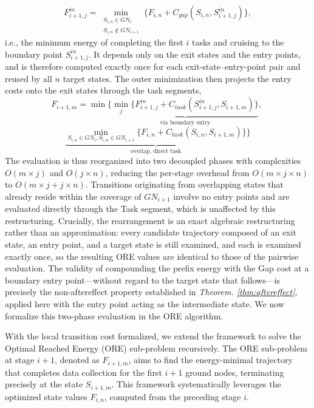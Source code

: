 \begin{equation}
F^{in}_{i+1,j} = \min_{\substack{S_{i,n} \in GN_i \\ S_{i,n} \notin GN_{i+1}}} \big\{ F_{i,n} + C_{gap}(S_{i,n}, S^{in}_{i+1,j}) \big\},
\label{equ:fin}
\end{equation}
i.e., the minimum energy of completing the first $i$ tasks and cruising to the boundary point $S^{in}_{i+1,j}$.
It depends only on the exit states and the entry points, and is therefore computed exactly once for each exit-state--entry-point pair and reused by all $n$ target states.
The outer minimization then projects the entry costs onto the exit states through the task segments,
\[
F_{i+1,m} = \min\Big\{ \underbrace{\min_{j} \big\{ F^{in}_{i+1,j}+ C_{task}(S^{in}_{i+1,j}, S_{i+1,m}) \big\}}_{\text{via boundary entry}},\;
\]
\[
 \underbrace{\min_{S_{i,n} \in GN_i , S_{i,n} \in GN_{i+1}} \big\{ F_{i,n} + C_{task}(S_{i,n}, S_{i+1,m}) \big\}}_{\text{overlap, direct task}} \Big\}
\]
The evaluation is thus reorganized into two decoupled phases with complexities $O(m \times j)$ and $O(j \times n)$, reducing the per-stage overhead from $O(m \times j \times n)$ to $O(m \times j + j\times n)$.
Transitions originating from overlapping states that already reside within the coverage of $GN_{i+1}$ involve no entry points and are evaluated directly through the Task segment, which is unaffected by this restructuring.
Crucially, the rearrangement is an exact algebraic restructuring rather than an approximation: every candidate trajectory composed of an exit state, an entry point, and a target state is still examined, and each is examined exactly once, so the resulting ORE values are identical to those of the pairwise evaluation.
The validity of compounding the prefix energy with the Gap cost at a boundary entry point—without regard to the target state that follows—is precisely the non-aftereffect property established in \textit{Theorem. \ref{thm:aftereffect}}, applied here with the entry point acting as the intermediate state.
We now formalize this two-phase evaluation in the ORE algorithm.

With the local transition cost formalized, we extend the framework to solve the Optimal Reached Energy (ORE) sub-problem recursively.
The ORE sub-problem at stage $i+1$, denoted as $F_{i+1,m}$, aims to find the energy-minimal trajectory that completes data collection for the first $i+1$ ground nodes, terminating precisely at the state $S_{i+1,m}$.
This framework systematically leverages the optimized state values $F_{i,n}$, computed from the preceding stage $i$.

